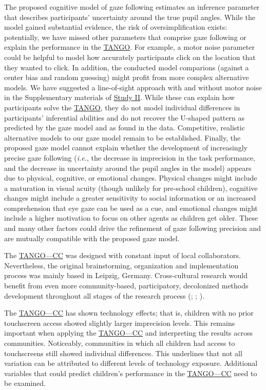\documentclass[
]{scrbook}
\begin{document}
The proposed cognitive model of gaze following estimates an inference parameter that describes participants' uncertainty around the true pupil angles. While the model gained substantial evidence, the risk of oversimplification exists: potentially, we have missed other parameters that comprise gaze following or explain the performance in the \hyperref[acronyms_TANGO]{TANGO}. For example, a motor noise parameter could be helpful to model how accurately participants click on the location that they wanted to click. In addition, the conducted model comparions (against a center bias and random guessing) might profit from more complex alternative models. We have suggested a line-of-sight approach with and without motor noise in the Supplementary materials of \hyperref[studyII]{Study II}. While these can explain how participants solve the \hyperref[acronyms_TANGO]{TANGO}, they do not model individual differences in participants' inferential abilities and do not recover the U-shaped pattern as predicted by the gaze model and as found in the data. Competitive, realistic alternative models to our gaze model remain to be established. Finally, the proposed gaze model cannot explain whether the development of increasingly precise gaze following (\emph{i.e.}, the decrease in imprecision in the task performance, and the decrease in uncertainty around the pupil angles in the model) appears due to physical, cognitive, or emotional changes. Physical changes might include a maturation in visual acuity (though unlikely for pre-school children), cognitive changes might include a greater sensitivity to social information or an increased comprehension that eye gaze can be used as a cue, and emotional changes might include a higher motivation to focus on other agents as children get older. These and many other factors could drive the refinement of gaze following precision and are mutually compatible with the proposed gaze model.

The \hyperref[acronyms_TANGOux2014CC]{TANGO---CC} was designed with constant input of local collaborators. Nevertheless, the original brainstorming, organization and implementation process was mainly based in Leipzig, Germany. Cross-cultural research would benefit from even more community-based, participatory, decolonized methods development throughout all stages of the research process (; ; ).

The \hyperref[acronyms_TANGOux2014CC]{TANGO---CC} has shown technology effects; that is, children with no prior touchscreen access showed slightly larger imprecision levels. This remains important when applying the \hyperref[acronyms_TANGOux2014CC]{TANGO---CC} and interpreting the results across communities. Noticeably, communities in which all children had access to touchscreens still showed individual differences. This underlines that not all variation can be attributed to different levels of technology exposure. Additional variables that could predict children's performance in the \hyperref[acronyms_TANGOux2014CC]{TANGO---CC} need to be examined.
\end{document}
